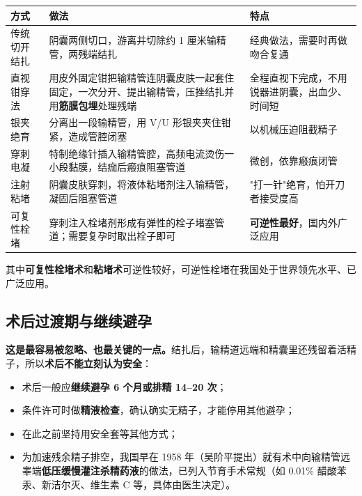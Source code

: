 \documentclass[12pt,UTF8,openany]{ctexbook}
\begin{document}
\begin{center}
\renewcommand{\arraystretch}{1.3}
\begin{tabularx}{\textwidth}{|X|X|X|}
\hline
\textbf{方式} & \textbf{做法} & \textbf{特点} \\
\hline
传统切开结扎 & 阴囊两侧切口，游离并切除约 1 厘米输精管，两残端结扎 & 经典做法，需要时再做吻合复通 \\
\hline
直视钳穿法 & 用皮外固定钳把输精管连阴囊皮肤一起套住固定，一次分开、提出输精管，压挫结扎并用\textbf{筋膜包埋}处理残端 & 全程直视下完成，不用锐器进阴囊，出血少、时间短 \\
\hline
银夹绝育 & 分离出一段输精管，用 V/U 形银夹夹住钳紧，造成管腔闭塞 & 以机械压迫阻截精子 \\
\hline
穿刺电凝 & 特制绝缘针插入输精管腔，高频电流烫伤一小段黏膜，结痂后瘢痕阻塞管道 & 微创，依靠瘢痕闭管 \\
\hline
注射粘堵 & 阴囊皮肤穿刺，将液体粘堵剂注入输精管，凝固后阻塞管道 & "打一针"绝育，怕开刀者接受度高 \\
\hline
可复性栓堵 & 穿刺注入栓堵剂形成有弹性的栓子堵塞管道；需要复孕时取出栓子即可 & \textbf{可逆性最好}，国内外广泛应用 \\
\hline
\end{tabularx}
\end{center}

其中\textbf{可复性栓堵术}和\textbf{粘堵术}可逆性较好，可逆性栓堵在我国处于世界领先水平、已广泛应用。

\subsection*{术后过渡期与继续避孕}

\textbf{这是最容易被忽略、也最关键的一点。}结扎后，输精道远端和精囊里还残留着活精子，所以\textbf{术后不能立刻认为安全}：

\begin{itemize}
  \item 术后一般应\textbf{继续避孕 6 个月或排精 14–20 次}；
  \item 条件许可时做\textbf{精液检查}，确认确实无精子，才能停用其他避孕；
  \item 在此之前坚持用安全套等其他方式；
  \item 为加速残余精子排空，我国早在 1958 年（吴阶平提出）就有术中向输精管远睾端\textbf{低压缓慢灌注杀精药液}的做法，已列入节育手术常规（如 0.01\% 醋酸苯汞、新洁尔灭、维生素 C 等，具体由医生决定）。
\end{itemize}
\end{document}
